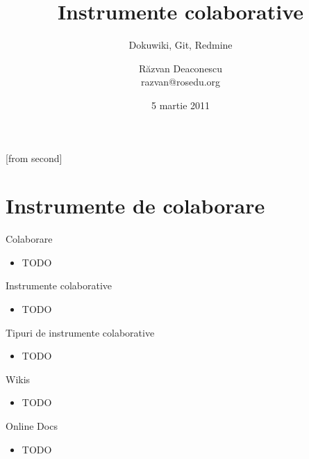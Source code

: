 \documentclass{beamer}
\title[Intrumente colaborative]{Instrumente colaborative}
\subtitle{Dokuwiki, Git, Redmine}
\institute{ROSEdu Tech Talks}
\author[Răzvan Deaconescu]{Răzvan Deaconescu\\
  razvan@rosedu.org}
\date{5 martie 2011}
\begin{document}
[from second]



\frame{\titlepage}

\frame{\tableofcontents}

\section{Instrumente de colaborare}

\begin{frame}{Colaborare}
  \begin{itemize}
    \item TODO
  \end{itemize}
\end{frame}

\begin{frame}{Instrumente colaborative}
  \begin{itemize}
    \item TODO
  \end{itemize}
\end{frame}

\begin{frame}{Tipuri de instrumente colaborative}
  \begin{itemize}
    \item TODO
  \end{itemize}
\end{frame}

\begin{frame}{Wikis}
  \begin{itemize}
    \item TODO
  \end{itemize}
\end{frame}

\begin{frame}{Online Docs}
  \begin{itemize}
    \item TODO
  \end{itemize}
\end{frame}
\end{document}
